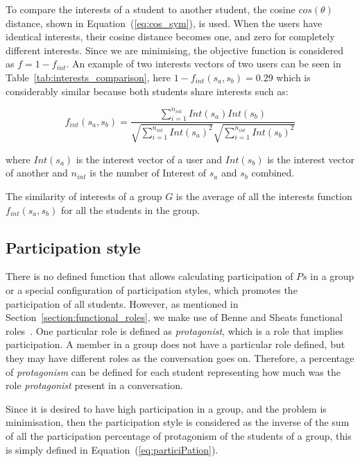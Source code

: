 To compare the interests of a student to another student, the cosine $cos(\theta)$ distance, shown in Equation~(\ref{eq:cos_sym}), is used. When the users have identical interests, their cosine distance becomes one, and zero for completely different interests. Since we are minimising, the objective function is considered as $f = 1 - f_{int}$. An example of two interests vectors of two users can be seen in Table~\ref{tab:interests_comparison}, here $1 - f_{int}(s_a,s_b) = 0.29$ which is considerably similar because both students share interests such as: 

\begin{equation} \label{eq:cos_sym}
     f_{int}(s_a,s_b) = \frac{ \sum\limits_{i=1}^{n_{int}}{Int(s_a)  Int(s_b)} }{ \sqrt{\sum\limits_{i=1}^{n_{int}}{Int(s_a)^2}}  \sqrt{\sum\limits_{i=1}^{n_{int}}{Int(s_b)^2}} }   
\end{equation}

\noindent where $Int(s_a)$ is the interest vector of a user and $Int(s_b)$ is the interest vector of another and $n_{int}$ is the number of Interest of $s_a$ and $s_b$ combined.\

The similarity of interests of a group $G$ is the average of all the interests function $f_{int}(s_a,s_b)$ for all the students in the group.\

\subsection{Participation style}


There is no defined function that allows calculating participation of $Ps$ in a group or a special configuration of participation styles, which promotes the participation of all students. 
However, as mentioned in Section~\ref{section:functional_roles}, we make use of Benne and Sheats functional roles~\cite{FunctionalRoles}. One particular role is defined as \textit{protagonist}, which is a role that implies participation. A member in a group does not have a particular role defined, but they may have different roles as the conversation goes on. Therefore, a percentage of \textit{protagonism} can be defined for each student representing how much was the role \textit{protagonist} present in a conversation.\

Since it is desired to have high participation in a group, and the problem is minimisation, then the participation style is considered as the inverse of the sum of all the participation percentage of protagonism of the students of a group, this is simply defined in Equation~(\ref{eq:particiPation}).\

